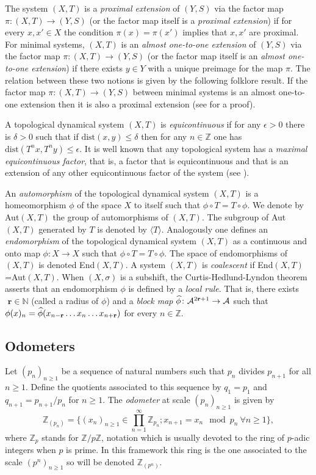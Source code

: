 \documentclass{daj}
\theoremstyle{plain}
\theoremstyle{definition}
\begin{document}
The system $(X,T)$ is a {\em proximal extension} of $(Y,S)$ via the factor map \break $\pi\colon (X,T)\to (Y,S)$ (or the factor map itself is a {\it proximal extension}) if for every $x,x'\in X$ the condition $\pi(x)=\pi(x')$ implies that $x,x'$ are proximal.
For minimal systems, $(X,T)$ is an {\em almost one-to-one extension} of $(Y,S)$ via the factor map $\pi:(X,T)\to (Y,S)$ (or the factor map itself is an {\it almost one-to-one extension}) if there exists $y \in Y$ with a unique preimage for the map $\pi$.
The relation between these two notions is given by the following folklore result.
If the factor map $\pi:(X,T)\to (Y,S)$ between minimal systems  
is an almost one-to-one extension then it is also a proximal extension (see \cite{DonosoDurandMaassPetite} for a proof).  

A topological dynamical system $(X,T)$ is \emph{equicontinuous} if for any $\epsilon>0$ there is $\delta >0$ such that  if $\textrm{dist}(x,y)\leq \delta$ then for any $n\in \mathbb{Z}$ one has $\text{dist}(T^nx,T^ny)\leq \epsilon$. It is well known that any topological system has a \emph{maximal equicontinuous factor}, that is, a factor that is equicontinuous and that is an extension of any other equicontinuous factor of the system (see \cite{Aus}).  


An {\it automorphism} of the topological dynamical system $(X,T)$ is a homeomorphism $\phi$ of the space $X$ to itself such that $\phi\circ T=T\circ \phi$.
We denote by Aut$(X,T)$ the group of automorphisms of $(X,T)$. The subgroup of Aut$(X,T)$ generated by $T$ is denoted by $\langle T \rangle$. Analogously one defines an {\it endomorphism} of the topological dynamical system $(X,T)$ as a continuous and onto map $\phi\colon X \to X$ such that $\phi\circ T=T\circ \phi$. The space of endomorphisms of $(X,T)$ is denoted End$(X,T)$. A system $(X,T)$ is {\it coalescent} if 
End$(X,T)$=Aut$(X,T)$. When $(X,\sigma)$ is a subshift, the Curtis-Hedlund-Lyndon theorem asserts that an endomorphism $\phi$ is defined by a {\it local rule}. That is, there exists ${\textbf{ r}}\in \mathbb{N}$ (called a radius of $\phi$) and a {\em block map} $\widehat{\phi}\colon \mathcal{A}^{2{\bf r}+1}\to \mathcal{A}$ such that $\phi(x)_{n}=\widehat{\phi}(x_{n-{\bf r}}\ldots x_{n} \ldots x_{n+{\bf r}})$ for every $n\in \mathbb{Z}$. 

\subsection{Odometers}
Let $(p_n)_{n\geq 1}$ be a sequence of natural numbers such that $p_n$ divides $p_{n+1}$ for all 
$n\geq 1$. Define the quotients associated to this sequence by $q_1=p_1$ and $q_{n+1}=p_{n+1}/p_{n}$ for $n\geq 1$. 
The \emph{odometer} at scale $(p_n)_{n\geq 1}$ is given by
\[  \mathbb{Z}_{(p_{n})} = \{ (x_{n})_{n\ge 1 } \in \prod_{n=1}^\infty \mathbb{Z}_{ p_{n}} ; x_{n+1}=  x_n \mod p_{n} \  \forall n \geq 1\},\]
where $\mathbb{Z}_{p}$ stands for $\mathbb{Z} / p\mathbb{Z}$, notation which is usually devoted to the ring of $p$-adic integers when $p$ is prime.
In this framework this ring is the one associated to the scale $(p^n)_{n\geq 1}$ so will be denoted $\mathbb{Z}_{(p^n)}$. 
\end{document}
